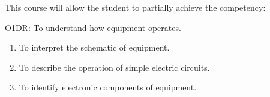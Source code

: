 {This course will allow the student to partially achieve the competency:

O1DR:  To understand how equipment operates.
\begin{enumerate}
\item To interpret the schematic of equipment.
\item To describe the operation of simple electric circuits.
\item To identify electronic components of equipment.
\end{enumerate}
\smallskip

}